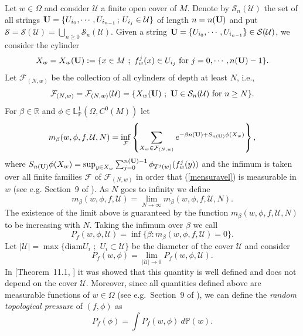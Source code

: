\documentclass[12pt,a4paper]{amsart}
\theoremstyle{plain}
\begin{document}
	Let $w\in \Omega$ and consider $\mathcal{U}$ a finite open cover of $M$. Denote by $\mathcal{S}_n(\mathcal{U})$ the set of all strings ${\bf{U}}=\{U_{i_0}, \cdots, U_{i_{n-1}}\,;\, U_{i_j}\in \mathcal{U}\}$ of length $n=n({\bf{U}})$ and put $\mathcal{S}=\mathcal{S}(\mathcal{U})=\bigcup_{n\geq 0}\mathcal{S}_n(\mathcal{U})$.
	Given a string ${\bf{U}}=\{U_{i_0}, \cdots, U_{i_{n-1}}\}\in\mathcal{S}(\mathcal{U})$,  we consider the cylinder 
	$$X_w=X_{w}({\bf{U}}):=\{x\in M\,\, ;\,\,  f^{j}_w(x)\in U_{i_j}\,\, \mbox{for}\,\, j=0, \cdots, n({\bf U})-1\}.$$
	Let $\mathcal{F}_{(N, w)}$ be the collection of all cylinders of depth at least $N$,  i.e., 
	$$\mathcal{F}_{(N, w)}=\mathcal{F}_{(N, w)}(\mathcal{U})=\{X_{w}({\bf{U}})\,\, ;\,\, {\bf{U}}\in \mathcal{S}_n(\mathcal{U})\,\, \mbox{for}\,\, n\geq N \}.$$
	For $\beta\in \mathbb{R}$ and $\phi \in  \mathbb{L}^{1}_{\mathbb{P}}(\Omega,C^0(M))$ let
	\begin{equation}\label{mensuravel}
		m_{\beta}(w, \phi, f, \mathcal{U}, N)=\displaystyle{\inf_{\mathcal{F}}}\left\{ \sum_{X_{w}\in\mathcal{F}_{(N, w)}} e^{-\beta n({\bf{U}}) + S_{n({\bf{U}})}\phi(X_w)}  \right\},
	\end{equation}
	where $S_{n({\bf{U}})}\phi(X_w)=\sup_{y\in X_w}\sum_{j=0}^{n({\bf U})-1}\phi_{T^{j}(w)}(f^{j}_{w}(y))$ and the infimum is taken over all finite families $\mathcal{F}$ of $\mathcal{F}_{(N, w)}$ in order that (\ref{mensuravel}) is measurable in $w$ (see e.g. Section~9 of \cite{SSV}). As $N$ goes to infinity we define 
	\[
	m_{\beta}(w, \phi, f, \mathcal{U})=\lim_{N\to \infty}m_{\beta}(w, \phi, f, \mathcal{U}, N).
	\]
	The existence of the limit above is guaranteed by the function $m_{\beta}(w, \phi, f, \mathcal{U}, N)$ to be increasing with $N$. Taking the infimum over $\beta$ we call
	\[
	P_{f}(w, \phi, \mathcal {U})=\inf\{\beta: m_{\beta}(w, \phi, f, \mathcal{U})=0 \}.
	\]
	Let $|\mathcal{U}|=\max\{\mbox{diam} U_i\,\,;\,\,U_i\subset\mathcal{U}\}$ be the diameter of the cover $\mathcal{U}$ and consider 
	$$P_{f} (w, \phi)=\lim_{|\mathcal{U}|\rightarrow 0} {P_{f} (w, \phi, \mathcal{U})}.$$
	In [Theorem~11.1, \cite{Pe2}] it was showed that this quantity is well defined and does not depend on the cover $\mathcal{U}$. Moreover, since all quantities defined above are measurable functions of $w\in \Omega$ (see e.g.~Section~9 of \cite{SSV}), we can define the \emph{random topological pressure} of $(f, \phi)$ as
	\[
	P_{f} (\phi)= \int P_{f} (w, \phi)\ d\mathbb{P}(w). 
	\]	
	
\end{document}
